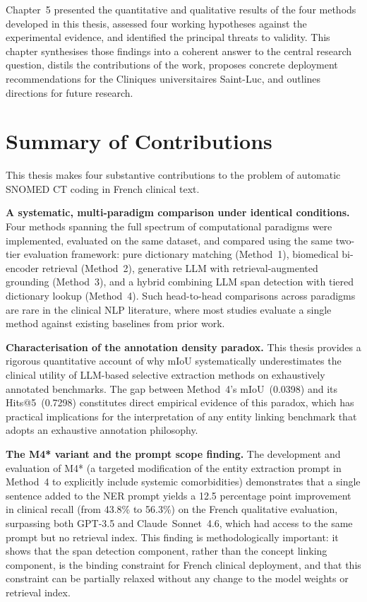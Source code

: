 
Chapter~5 presented the quantitative and qualitative results of the four methods developed in this thesis, assessed four working hypotheses against the experimental evidence, and identified the principal threats to validity. This chapter synthesises those findings into a coherent answer to the central research question, distils the contributions of the work, proposes concrete deployment recommendations for the Cliniques universitaires Saint-Luc, and outlines directions for future research.

\section{Summary of Contributions}

This thesis makes four substantive contributions to the problem of automatic SNOMED CT coding in French clinical text.

\textbf{A systematic, multi-paradigm comparison under identical conditions.} Four methods spanning the full spectrum of computational paradigms were implemented, evaluated on the same dataset, and compared using the same two-tier evaluation framework: pure dictionary matching (Method~1), biomedical bi-encoder retrieval (Method~2), generative LLM with retrieval-augmented grounding (Method~3), and a hybrid combining LLM span detection with tiered dictionary lookup (Method~4). Such head-to-head comparisons across paradigms are rare in the clinical NLP literature, where most studies evaluate a single method against existing baselines from prior work.

\textbf{Characterisation of the annotation density paradox.} This thesis provides a rigorous quantitative account of why mIoU systematically underestimates the clinical utility of LLM-based selective extraction methods on exhaustively annotated benchmarks. The gap between Method~4's mIoU~(0.0398) and its Hits@5~(0.7298) constitutes direct empirical evidence of this paradox, which has practical implications for the interpretation of any entity linking benchmark that adopts an exhaustive annotation philosophy.

\textbf{The M4* variant and the prompt scope finding.} The development and evaluation of M4* (a targeted modification of the entity extraction prompt in Method~4 to explicitly include systemic comorbidities) demonstrates that a single sentence added to the NER prompt yields a 12.5 percentage point improvement in clinical recall (from 43.8\% to 56.3\%) on the French qualitative evaluation, surpassing both GPT-3.5 and Claude~Sonnet~4.6, which had access to the same prompt but no retrieval index. This finding is methodologically important: it shows that the span detection component, rather than the concept linking component, is the binding constraint for French clinical deployment, and that this constraint can be partially relaxed without any change to the model weights or retrieval index.

